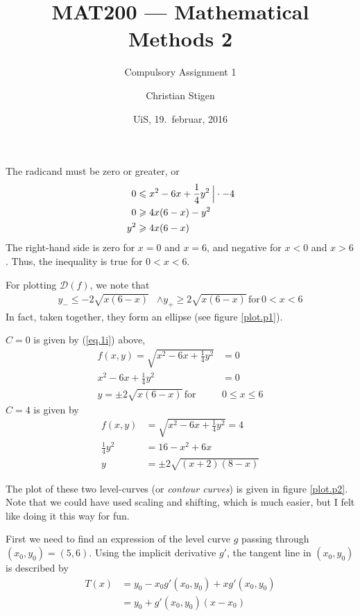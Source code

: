 \documentclass[a4paper,norsk,12pt]{article}
\title{MAT200 --- Mathematical Methods 2}
\subtitle{Compulsory Assignment 1}
\author{Christian Stigen}
\date{UiS, 19.~februar, 2016}
\begin{document}
\maketitle

\label{problem.1}

The radicand must be zero or greater, or
\begin{align*}
  0 & \leqslant x^2-6x+\frac{1}{4}y^2 \> \Big{|} \cdot-4 \\
  0 & \geqslant 4x(6-x)-y^2 \\
  y^2 & \geqslant 4x(6-x)
\end{align*}
The right-hand side is zero for $x=0$ and $x=6$, and negative for $x<0$
and $x>6$. Thus, the inequality is true for $0 < x < 6$.

For plotting $\mathcal{D}(f)$, we note that
  \begin{align}
    y_{-} \leqslant -2\sqrt{x(6-x)} & \wedge y_{+} \geqslant 2\sqrt{x(6-x)}
    \,\text{for}\, 0<x<6 \label{eq.1i}
  \end{align}
In fact, taken together, they form an ellipse (see figure \vref{plot.p1}).


$C=0$ is given by (\ref{eq.1i}) above,
\begin{align*}
  f(x,y) = \sqrt{x^2 - 6x + \frac{1}{4}y^2} &= 0\\
  x^2 - 6x + \frac{1}{4}y^2 &= 0\\
  y = \pm2\sqrt{x(6-x)} \, \text{for} \, &0 \leqslant x \leqslant 6
\end{align*}
$C=4$ is given by
\begin{align*}
  f(x,y) &= \sqrt{x^2 - 6x + \frac{1}{4}y^2} = 4\\
  \frac{1}{4}y^2 &= 16 - x^2 + 6x\\
  y &= \pm2\sqrt{(x+2)(8-x)}
\end{align*}

The plot of these two level-curves (or \textit{contour curves}) is given in figure
\vref{plot.p2}. Note that we could have used scaling and shifting, which is
much easier, but I felt like doing it this way for fun.

First we need to find an expression of the level curve $g$ passing through $(x_0,
y_0) = (5,6)$. Using the implicit derivative $g'$, the tangent line in $(x_0,
y_0)$ is described by
\begin{align*}
  T(x) &= y_0 - x_0 g'(x_0, y_0) + xg'(x_0, y_0) \\
       &= y_0 + g'(x_0, y_0)\left( x - x_0 \right)
\end{align*}
\end{document}
